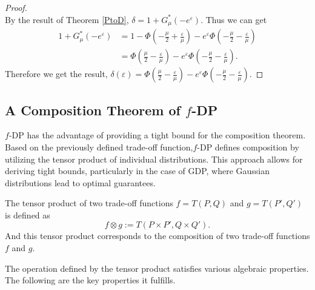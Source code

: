 \documentclass{article}
\begin{document}
\begin{corollary}
\begin{proof}
\begin{equation*}
        \end{equation*}
        By the result of Theorem \ref{PtoD}, $\delta = 1 + G_\mu^*(-e^\varepsilon)$. Thus we can get 
        \begin{align*}
            1 + G_\mu^*(-e^\varepsilon) &= 1- \Phi\left(-\frac{\mu}{2}+\frac{\varepsilon} {\mu}\right) -e^\varepsilon\Phi\left(-\frac{\mu}{2}- \frac{\varepsilon}{\mu}\right)\\
            &=\Phi\left(\frac{\mu}{2}-\frac{\varepsilon} {\mu}\right) -e^\varepsilon\Phi\left(-\frac{\mu}{2}- \frac{\varepsilon}{\mu}\right).
        \end{align*}
    Therefore we get the result, $\delta(\varepsilon) =\Phi\left(\frac{\mu}{2}-\frac{\varepsilon} {\mu}\right) -e^\varepsilon\Phi\left(-\frac{\mu}{2}- \frac{\varepsilon}{\mu}\right)$.
    \end{proof}
\end{corollary}

\subsection{A Composition Theorem of \texorpdfstring{$f$}{f}-DP}
$f$-DP has the advantage of providing a tight bound for the composition theorem. Based on the previously defined trade-off function,$f$-DP defines composition by utilizing the tensor product of individual distributions. This approach allows for deriving tight bounds, particularly in the case of GDP, where Gaussian distributions lead to optimal guarantees.

\begin{definition}
    The tensor product of two trade-off functions $f= T(P,Q)$ and $g = T(P',Q')$ is defined as 
    \begin{equation*} 
        f\otimes g := T(P \times P', Q \times Q').
    \end{equation*}
    And this tensor product corresponds to the composition of two trade-off functions $f$ and $g$.
\end{definition}

The operation defined by the tensor product satisfies various algebraic properties. The following are the key properties it fulfills.
\end{document}
